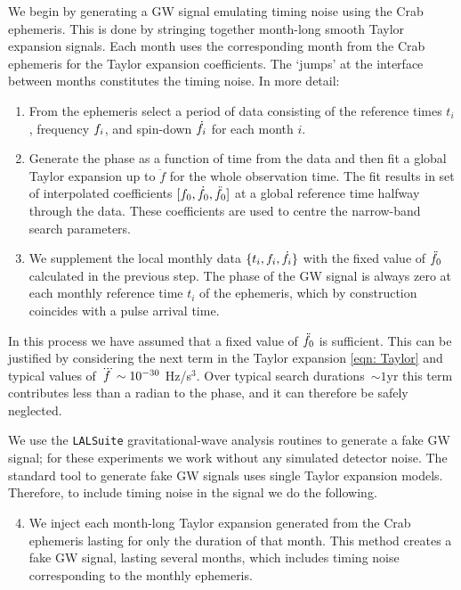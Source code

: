 \documentclass[../full_thesis/full_thesis.tex]{subfiles}
\begin{document}
We begin by generating a GW signal emulating timing noise using the Crab
ephemeris. This is done by stringing together month-long smooth Taylor expansion
signals. Each month uses the corresponding month from the Crab
ephemeris for the Taylor expansion coefficients. The `jumps' at the interface
between months constitutes the timing noise.
In more detail:
\begin{enumerate}

\item From the ephemeris select a period of data consisting of the reference
times $t_i$, frequency $f_i$, and spin-down
$\dot{f}_i$ for each month $i$.

\item \label{fit} Generate the phase as a function of time from the data and
then fit a global Taylor expansion up to $\ddot{f}$ for the whole
observation time.  The fit results in set of interpolated coefficients
$[f_{0}, \dot{f}_{0}, \ddot{f}_{0}]$ at a global reference time halfway through
the data. These coefficients are used to centre the narrow-band search
parameters.

\item We supplement the local monthly data $\{t_i, f_{i}, \dot{f}_{i}\}$ with
the fixed value of $\ddot{f}_{0}$ calculated in the previous step. The phase of
the GW signal is always zero at each monthly reference time $t_i$ of the
ephemeris, which by construction coincides with a pulse arrival time.

\end{enumerate}

In this process we have assumed that a fixed value of $\ddot{f}_{0}$ is
sufficient. This can be justified by considering the next term in the Taylor
expansion \eqref{eqn: Taylor} and typical values of $\dddot{f} \sim 10^{-30}$
Hz/s$^{3}$.  Over typical search durations~$\sim 1$yr this term contributes
less than a radian to the phase, and it can therefore be safely neglected.

We use the \verb+LALSuite+ \cite{lalsuite} gravitational-wave analysis routines
to generate a fake GW signal; for these experiments we work
without any simulated detector noise. The standard tool to generate fake GW
signals uses single Taylor expansion models. Therefore, to include timing noise
in the signal we do the following.

\begin{enumerate}
\setcounter{enumi}{3}

\item We inject each month-long Taylor expansion generated from the Crab ephemeris
lasting for only the duration of that month.
This
method creates a fake GW signal, lasting several months, which includes timing noise corresponding to the monthly
ephemeris.

\end{enumerate}
\end{document}
